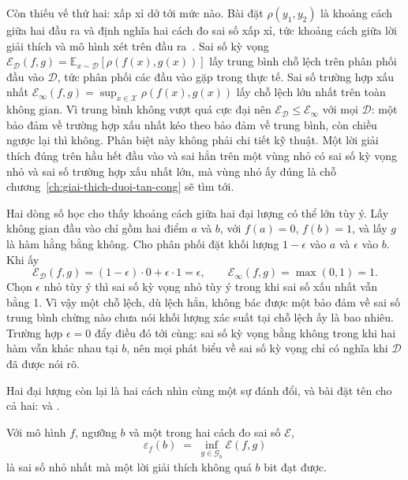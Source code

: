%
Còn thiếu vế thứ hai: xấp xỉ dở tới mức nào. Bài đặt $\rho(y_1,y_2)$ là khoảng
cách giữa hai đầu ra và định nghĩa hai cách đo sai số xấp xỉ, tức khoảng cách
giữa lời giải thích và mô hình xét trên đầu ra~\autocite{p26limits}. Sai số kỳ
vọng
$\mathcal{E}_{\mathcal{D}}(f,g) = \mathbb{E}_{x \sim \mathcal{D}}[\rho(f(x),g(x))]$
lấy trung bình chỗ lệch trên phân phối đầu vào $\mathcal{D}$, tức phân phối các
đầu vào gặp trong thực tế. Sai số trường hợp xấu nhất
$\mathcal{E}_{\infty}(f,g) = \sup_{x \in \mathcal{X}} \rho(f(x),g(x))$ lấy chỗ
lệch lớn nhất trên toàn không gian. Vì trung bình không vượt quá cực đại nên
$\mathcal{E}_{\mathcal{D}} \le \mathcal{E}_{\infty}$ với mọi $\mathcal{D}$: một
bảo đảm về trường hợp xấu nhất kéo theo bảo đảm về trung bình, còn chiều ngược
lại thì không. Phân biệt này không phải chi tiết kỹ thuật. Một lời giải thích
đúng trên hầu hết đầu vào và sai hẳn trên một vùng nhỏ có sai số kỳ vọng nhỏ và
sai số trường hợp xấu nhất lớn, mà vùng nhỏ ấy đúng là chỗ
chương~\ref{ch:giai-thich-duoi-tan-cong} sẽ tìm tới.

Hai dòng số học cho thấy khoảng cách giữa hai đại lượng có thể lớn tùy ý. Lấy
không gian đầu vào chỉ gồm hai điểm $a$ và $b$, với $f(a) = 0$, $f(b) = 1$, và
lấy $g$ là hàm hằng bằng không. Cho phân phối đặt khối lượng $1-\epsilon$ vào
$a$ và $\epsilon$ vào $b$. Khi ấy
\[
  \mathcal{E}_{\mathcal{D}}(f,g) = (1-\epsilon)\cdot 0 + \epsilon \cdot 1
  = \epsilon,
  \qquad
  \mathcal{E}_{\infty}(f,g) = \max(0,1) = 1 .
\]
Chọn $\epsilon$ nhỏ tùy ý thì sai số kỳ vọng nhỏ tùy ý trong khi sai số xấu nhất
vẫn bằng 1. Vì vậy một chỗ lệch, dù lệch hẳn, không bác được một bảo đảm về sai
số trung bình chừng nào chưa nói khối lượng xác suất tại chỗ lệch ấy là bao
nhiêu. Trường hợp $\epsilon = 0$ đẩy điều đó tới cùng: sai số kỳ vọng bằng không
trong khi hai hàm vẫn khác nhau tại $b$, nên mọi phát biểu về sai số kỳ vọng chỉ
có nghĩa khi $\mathcal{D}$ đã được nói rõ.

Hai đại lượng còn lại là hai cách nhìn cùng một sự đánh đổi, và bài đặt tên cho
cả hai:  và .

\begin{definition}
\label{def:ch13-ham-sai-so}
Với mô hình $f$, ngưỡng $b$ và một trong hai cách đo sai số $\mathcal{E}$,
\[
  \varepsilon_f(b) \;=\; \inf_{g \in \mathcal{G}_b} \mathcal{E}(f,g)
\]
là sai số nhỏ nhất mà một lời giải thích không quá $b$ bit đạt được.
\end{definition}

